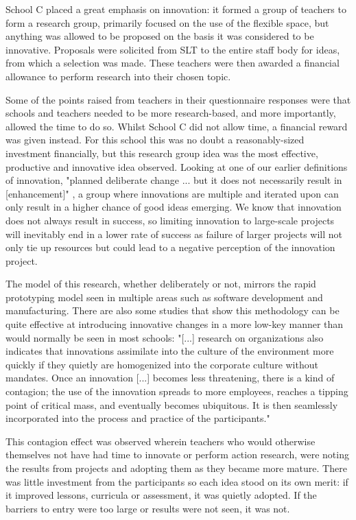 School C placed a great emphasis on innovation: it formed a group of teachers to form a research group, primarily focused on the use of the flexible space, but anything was allowed to be proposed on the basis it was considered to be innovative. Proposals were solicited from SLT to the entire staff body for ideas, from which a selection was made. These teachers were then awarded a financial allowance to perform research into their chosen topic. 

Some of the points raised from teachers in their questionnaire responses were that schools and teachers needed to be more research-based, and more importantly, allowed the time to do so. Whilst School C did not allow time, a financial reward was given instead. For this school this was no doubt a reasonably-sized investment financially, but this research group idea was the most effective, productive and innovative idea observed. Looking at one of our earlier definitions of innovation, "planned deliberate change ... but it does not necessarily result in [enhancement]" \cite{hannan2002innovative}, a group where innovations are multiple and iterated upon can only result in a higher chance of good ideas emerging. We know that innovation does not always result in success, so limiting innovation to large-scale projects will inevitably end in a lower rate of success as failure of larger projects will not only tie up resources but could lead to a negative perception of the innovation project.

The model of this research, whether deliberately or not, mirrors the rapid prototyping model seen in multiple areas such as software development and manufacturing. There are also some studies that show this methodology can be quite effective at introducing innovative changes in a more low-key manner than would normally be seen in most schools: "[...] research on organizations also indicates that innovations assimilate into the culture of the environment more quickly if they quietly are homogenized into the corporate culture without mandates. Once an innovation [...] becomes less threatening, there is a kind of contagion; the use of the innovation spreads to more employees, reaches a tipping point of critical mass, and eventually becomes ubiquitous. It is then seamlessly incorporated into the process and practice of the participants." \cite{cook2008combining}

This contagion effect was observed wherein teachers who would otherwise themselves not have had time to innovate or perform action research, were noting the results from projects and adopting them as they became more mature. There was little investment from the participants so each idea stood on its own merit: if it improved lessons, curricula or assessment, it was quietly adopted. If the barriers to entry were too large or results were not seen, it was not.

